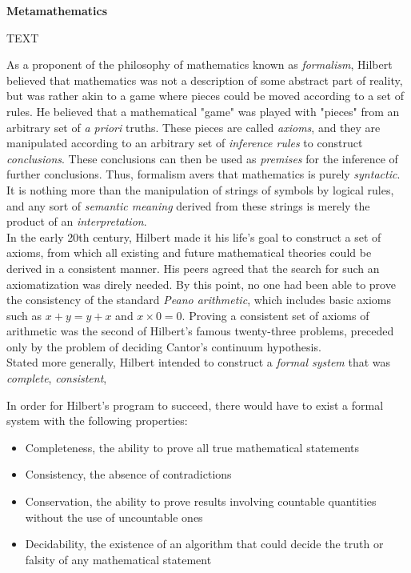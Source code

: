 
\begin{tcolorbox}[breakable, enhanced, colback=textbook-blue, sharp corners]
	\vspace{2mm}
	\begin{center}
		\textbf{Metamathematics}
	\end{center}
	\vspace{1mm}
	TEXT
	\vspace{1mm}
\end{tcolorbox}
\vspace{7mm}

As a proponent of the philosophy of mathematics known as \textit{formalism}, Hilbert believed that mathematics was not a description of some abstract part of reality, but was rather akin to a game where pieces could be moved according to a set of rules. He believed that a mathematical "game" was played with "pieces" from an arbitrary set of \textit{a priori} truths. These pieces are called \textit{axioms}, and they are manipulated according to an arbitrary set of \textit{inference rules} to construct \textit{conclusions}. These conclusions can then be used as \textit{premises} for the inference of further conclusions. Thus, formalism avers that mathematics is purely \textit{syntactic}. It is nothing more than the manipulation of strings of symbols by logical rules, and any sort of \textit{semantic meaning} derived from these strings is merely the product of an \textit{interpretation}. \\

In the early 20th century, Hilbert made it his life's goal to construct a set of axioms, from which all existing and future mathematical theories could be derived in a consistent manner. His peers agreed that the search for such an axiomatization was direly needed. By this point, no one had been able to prove the consistency of the standard \textit{Peano arithmetic}, which includes basic axioms such as $x+y=y+x$ and $x\times0=0$. Proving a consistent set of axioms of arithmetic was the second of Hilbert's famous twenty-three problems, preceded only by the problem of deciding Cantor's continuum hypothesis. \\

Stated more generally, Hilbert intended to construct a \textit{formal system} that was \textit{complete}, \textit{consistent},

In order for Hilbert's program to succeed, there would have to exist a formal system with the following properties:
\begin{itemize}
	\item Completeness, the ability to prove all true mathematical statements
	\item Consistency, the absence of contradictions
	\item Conservation, the ability to prove results involving countable quantities without the use of uncountable ones
	\item Decidability, the existence of an algorithm that could decide the truth or falsity of any mathematical statement
\end{itemize}

